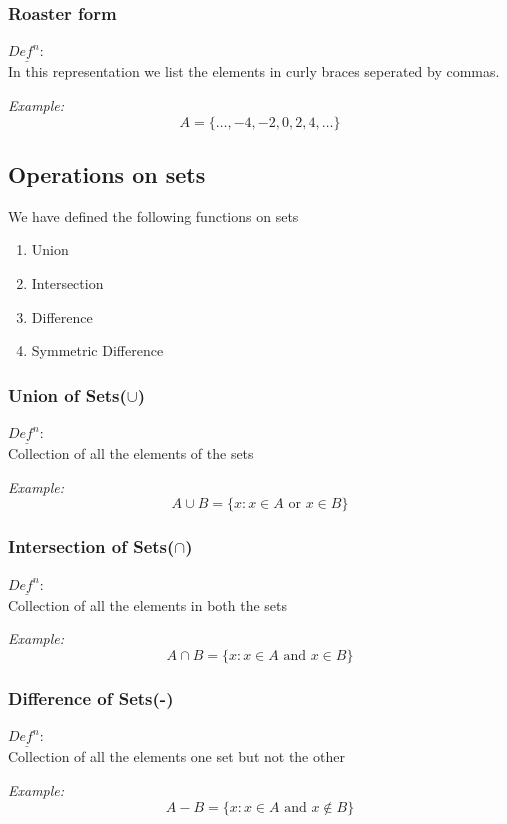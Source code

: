 \documentclass[11pt,letterpaper]{article}
\newenvironment{example}                             
        {\textit{Example:}\\}
	{}
\newenvironment{definition}
	{\begin{mdframed}$\underline{\textit{Def}^\textit{n}:} $\\}
	{\end{mdframed}}
\begin{document}
\subsubsection{Roaster form}
\begin{definition}
  In this representation we list the elements in curly braces seperated by commas. 
\end{definition}
\begin{example}
  \[
    A = \{\dots,-4,-2,0,2,4,\dots\}
  \]
\end{example}

\subsection{Operations on sets}
We have defined the following functions on sets 
\begin{enumerate}
  \item Union
  \item Intersection
  \item Difference
  \item Symmetric Difference
\end{enumerate}

\subsubsection{Union of Sets($\cup$)}
\begin{definition}
  Collection of all the elements of the sets
\end{definition}
\begin{example}
  \[
    A\cup B= \{x: x\in A \text{ or } x\in B\}
  \]
\end{example}

\subsubsection{Intersection of Sets($\cap$)}
\begin{definition}
  Collection of all the elements in both the sets
\end{definition}
\begin{example}
  \[
    A\cap B= \{x: x\in A \text{ and } x\in B\}
  \]
\end{example}

\subsubsection{Difference of Sets(-)}
\begin{definition}
  Collection of all the elements one set but not the other
\end{definition}
\begin{example}
  \[
    A-B= \{x: x\in A \text{ and } x\not\in B\}
  \]
\end{example}
\end{document}

